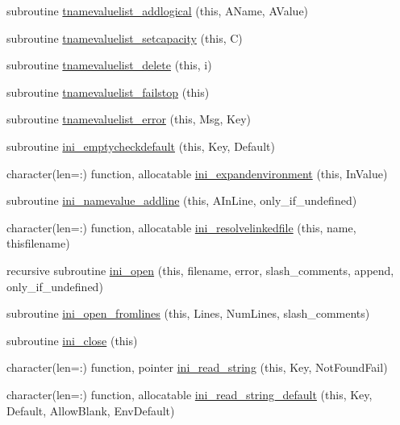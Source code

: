 \begin{DoxyCompactItemize}
\item 
subroutine \mbox{\hyperlink{namespaceiniobjects_a73327dd98a8e02b51bff94237d0cad1d}{tnamevaluelist\+\_\+addlogical}} (this, A\+Name, A\+Value)
\item 
subroutine \mbox{\hyperlink{namespaceiniobjects_a42d39e0fcf188dab68646beac2c1fa50}{tnamevaluelist\+\_\+setcapacity}} (this, C)
\item 
subroutine \mbox{\hyperlink{namespaceiniobjects_a7846fce943c898567326478e49f7741f}{tnamevaluelist\+\_\+delete}} (this, i)
\item 
subroutine \mbox{\hyperlink{namespaceiniobjects_a0e1ea28af24ea8496e138262c1da71f0}{tnamevaluelist\+\_\+failstop}} (this)
\item 
subroutine \mbox{\hyperlink{namespaceiniobjects_a24c1905bc9b561d8eeb12877f6a8cca3}{tnamevaluelist\+\_\+error}} (this, Msg, Key)
\item 
subroutine \mbox{\hyperlink{namespaceiniobjects_a872a852d7d01ebf31f03d17592e7fd31}{ini\+\_\+emptycheckdefault}} (this, Key, Default)
\item 
character(len=\+:) function, allocatable \mbox{\hyperlink{namespaceiniobjects_a3f10c54af4bf829a3e62436354908f1e}{ini\+\_\+expandenvironment}} (this, In\+Value)
\item 
subroutine \mbox{\hyperlink{namespaceiniobjects_a7b4567ba50cfd79f25f01c2a2b311e6b}{ini\+\_\+namevalue\+\_\+addline}} (this, A\+In\+Line, only\+\_\+if\+\_\+undefined)
\item 
character(len=\+:) function, allocatable \mbox{\hyperlink{namespaceiniobjects_a292876b02309b0dec55346a08b3b2cdd}{ini\+\_\+resolvelinkedfile}} (this, name, thisfilename)
\item 
recursive subroutine \mbox{\hyperlink{namespaceiniobjects_a74dae844438b97709e8a7fb1c44d87e9}{ini\+\_\+open}} (this, filename, error, slash\+\_\+comments, append, only\+\_\+if\+\_\+undefined)
\item 
subroutine \mbox{\hyperlink{namespaceiniobjects_acc50d404fe26696d6c641fabb4ae033f}{ini\+\_\+open\+\_\+fromlines}} (this, Lines, Num\+Lines, slash\+\_\+comments)
\item 
subroutine \mbox{\hyperlink{namespaceiniobjects_a54b6f011847c6047fd2e0dfbe9d9314d}{ini\+\_\+close}} (this)
\item 
character(len=\+:) function, pointer \mbox{\hyperlink{namespaceiniobjects_af8362fa0f894e89d84f084ec08dca575}{ini\+\_\+read\+\_\+string}} (this, Key, Not\+Found\+Fail)
\item 
character(len=\+:) function, allocatable \mbox{\hyperlink{namespaceiniobjects_a7a7f7950cdd1ae3e2c9e977fb7ce87a7}{ini\+\_\+read\+\_\+string\+\_\+default}} (this, Key, Default, Allow\+Blank, Env\+Default)

\end{DoxyCompactItemize}
